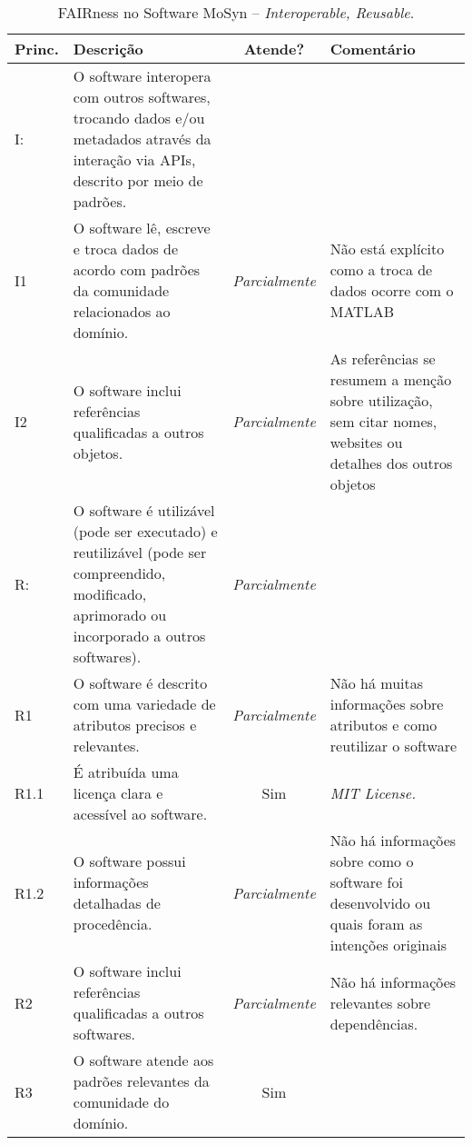      
\begin{table}[tb]
    \caption{FAIRness no Software MoSyn -- \textit{Interoperable, Reusable}.}
    \centering
    \small
    \begin{tabular}{p{0.9cm}|p{6cm}|c|p{4.3cm}}
    \hline
    Princ. & Descrição & Atende? & Comentário 
    \\ \hline
     I: & O software interopera com outros softwares, trocando dados e/ou metadados através da interação via APIs, descrito por meio de padrões. &  &  \\
     I1 & O software lê, escreve e troca dados de acordo com padrões da comunidade relacionados ao domínio. & \textit{Parcialmente} & Não está explícito como a troca de dados ocorre com o MATLAB \\
     I2 & O software inclui referências qualificadas a outros objetos. & \textit{Parcialmente} & As referências se resumem a menção sobre utilização, sem citar nomes, websites ou detalhes dos outros objetos \\
     \hline
     R: & O software é utilizável (pode ser executado) e reutilizável (pode ser compreendido, modificado, aprimorado ou incorporado a outros softwares). & \textit{Parcialmente} & \\
     R1 & O software é descrito com uma variedade de atributos precisos e relevantes. & \textit{Parcialmente} & Não há muitas informações sobre atributos e como reutilizar o software \\
     R1.1 & É atribuída uma licença clara e acessível ao software. & Sim &  \textit{MIT License.} \\
     R1.2 & O software possui informações detalhadas de procedência. & \textit{Parcialmente} & Não há informações sobre como o software foi desenvolvido ou quais foram as intenções originais \\
     R2 & O software inclui referências qualificadas a outros softwares. & \textit{Parcialmente} & Não há informações relevantes sobre dependências. \\
     R3 & O software atende aos padrões relevantes da comunidade do domínio. & Sim & \\
      \hline
    \end{tabular} \label{tab:fairness:garcia:ir}
\end{table}
